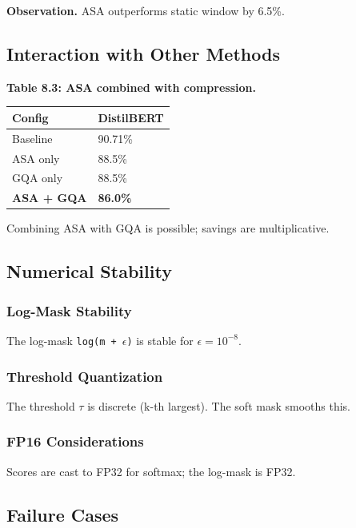 \textbf{Observation.} ASA outperforms static window by 6.5\%.

\subsection{Interaction with Other Methods}

\textbf{Table 8.3: ASA combined with compression.}

\begin{table}[H]
\centering
\small
\begin{tabular}{ll}
\toprule
\textbf{Config} & \textbf{DistilBERT} \\
\midrule
Baseline & 90.71\% \\
ASA only & 88.5\% \\
GQA only & 88.5\% \\
\textbf{ASA + GQA} & \textbf{86.0\%} \\
\bottomrule
\end{tabular}
\end{table}

Combining ASA with GQA is possible; savings are multiplicative.

\subsection{Numerical Stability}

\subsubsection{Log-Mask Stability}

The log-mask \texttt{log(m + $\epsilon$)} is stable for $\epsilon = 10^{-8}$.

\subsubsection{Threshold Quantization}

The threshold $\tau$ is discrete (k-th largest). The soft mask smooths this.

\subsubsection{FP16 Considerations}

Scores are cast to FP32 for softmax; the log-mask is FP32.

\subsection{Failure Cases}

